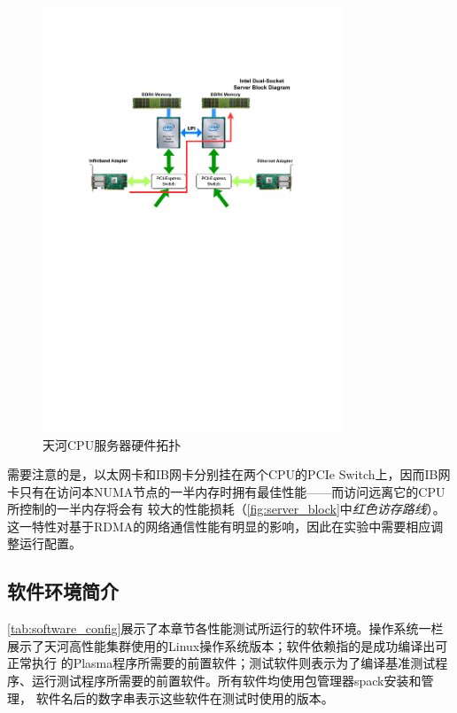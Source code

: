 \begin{figure}[h]
	\centering
	\includegraphics[width=0.8\textwidth]{image/chap04/server_block.pdf}
	\caption{天河CPU服务器硬件拓扑}
	\label{fig:server_block}
\end{figure}

需要注意的是，以太网卡和IB网卡分别挂在两个CPU的PCIe Switch上，因而IB网卡只有在访问本NUMA节点的一半内存时拥有最佳性能——而访问远离它的CPU所控制的一半内存将会有
较大的性能损耗（\autoref{fig:server_block}中\textit{红色访存路线}）。这一特性对基于RDMA的网络通信性能有明显的影响，因此在实验中需要相应调整运行配置。

\subsection{软件环境简介}

\autoref{tab:software_config}展示了本章节各性能测试所运行的软件环境。操作系统一栏展示了天河高性能集群使用的Linux操作系统版本；软件依赖指的是成功编译出可正常执行
的Plasma程序所需要的前置软件；测试软件则表示为了编译基准测试程序、运行测试程序所需要的前置软件。所有软件均使用包管理器spack\cite{gamblin2015spack}安装和管理，
软件名后的数字串表示这些软件在测试时使用的版本。

